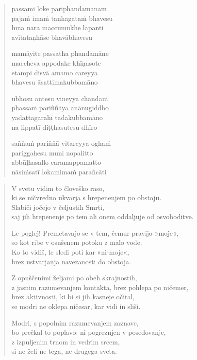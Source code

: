 
\clearpage
\begin{verse}

passāmi loke pariphandamānaṁ\\
pajaṁ imaṁ taṇhagataṁ bhavesu\\
hīnā narā maccumukhe lapanti\\
avītataṇhāse bhavābhavesu

mamāyite passatha phandamāne\\
maccheva appodake khīṇasote\\
etampi disvā amamo careyya\\
bhavesu āsattimakubbamāno

ubhosu antesu vineyya chandaṁ\\
phassaṁ pariññāya anānugiddho\\
yadattagarahī tadakubbamāno\\
na lippatī diṭṭhasutesu dhīro

saññaṁ pariññā vitareyya oghaṁ\\
pariggahesu muni nopalitto\\
abbūḷhasallo caramappamatto\\
nāsiṁsatī lokamimaṁ parañcāti

\end{verse}


\clearpage
\begin{verse}

V svetu vidim to človeško raso,\\
ki se ničvredno ukvarja s hrepenenjem po obstoju.\\
Slabiči jočejo v čeljustih Smrti,\\
saj jih hrepenenje po tem ali onem oddaljuje od osvoboditve.

Le poglej! Premetavajo se v tem, čemur pravijo »moje«,\\
so kot ribe v osušenem potoku z malo vode.\\
Ko to vidiš, le sledi poti kar »ni-moje«,\\
brez ustvarjanja navezanosti do obstoja.

Z opuščenimi željami po obeh skrajnostih,\\
z jasnim razumevanjem kontakta, brez pohlepa po ničemer,\\
brez aktivnosti, ki bi si jih kasneje očital,\\
se modri ne oklepa ničesar, kar vidi in sliši.

Modri, s popolnim razumevanjem zaznave,\\
bo prečkal to poplavo: ni pogreznjen v posedovanje,\\
z izpuljenim trnom in vedrim srcem,\\
si ne želi ne tega, ne drugega sveta.

\end{verse}

